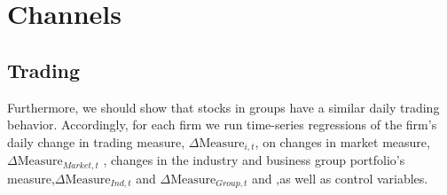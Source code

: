 \documentclass[12pt, a4paper]{article}
\begin{document}
\newpage

\section*{Channels} 
\subsection*{Trading}
% 
%
%
%
%
%
%
%		

Furthermore, we should show that stocks in groups have a similar daily trading behavior. Accordingly, for each firm we run time-series regressions of the firm's daily change in trading measure, $ \Delta \text{Measure}_{i,t} $, on changes in market measure,$ \Delta\text{Measure}_{Market,t}   $ , changes in the industry and business group portfolio's measure,$ \Delta\text{Measure}_{Ind,t} $ and  $\Delta \text{Measure}_{Group,t} $ and  ,as well as control variables.
\end{document}
